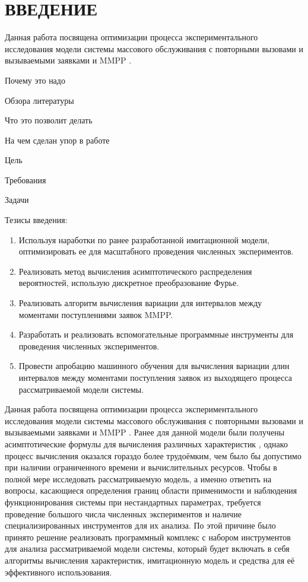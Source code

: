 \section*{ВВЕДЕНИЕ}

Данная работа посвящена оптимизации процесса экспериментального исследования модели системы массового обслуживания с повторными вызовами и вызываемыми заявками \cite{phung2019retrial} и MMPP \cite{baiocchi1993steady,2019asymptotic,meier1987fitting}.


Почему это надо

Обзора литературы

Что это позволит делать

На чем сделан упор в работе

Цель

Требования

Задачи

Тезисы введения:
\begin{enumerate}
	\item Используя наработки по ранее разработанной имитационной модели, оптимизировать ее для масштабного проведения численных экспериментов.
	\item Реализовать метод вычисления асимптотического распределения вероятностей, использую дискретное преобразование Фурье. 
	\item Реализовать алгоритм вычисления вариации для интервалов между моментами поступлениями заявок MMPP.
	\item Разработать и реализовать вспомогательные программные инструменты для проведения численных экспериментов.
	\item Провести апробацию машинного обучения для вычисления вариации длин интервалов между моментами поступления заявок из выходящего процесса рассматриваемой модели системы.
\end{enumerate}



Данная работа посвящена оптимизации процесса экспериментального исследования модели системы массового обслуживания с повторными вызовами и вызываемыми заявками \cite{phung2019retrial} и MMPP \cite{baiocchi1993steady,2019asymptotic,meier1987fitting}. Ранее для данной модели были получены асимптотические формулы для вычисления различных характеристик \cite{blaginin2020two,blaginin2021approximation}, однако процесс вычисления оказался гораздо более трудоёмким, чем было бы допустимо при наличии ограниченного времени и вычислительных ресурсов. Чтобы в полной мере исследовать рассматриваемую модель, а именно ответить на вопросы, касающиеся определения границ области применимости и наблюдения функционирования системы при нестандартных параметрах, требуется проведение большого числа численных экспериментов и наличие специализированных инструментов для их анализа. По этой причине было принято решение реализовать программный комплекс с набором инструментов для анализа рассматриваемой модели системы, который будет включать в себя алгоритмы вычисления характеристик, имитационную модель и средства для её эффективного использования.

